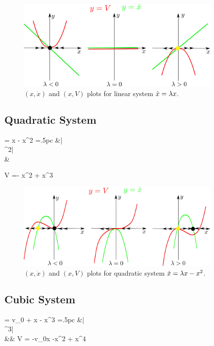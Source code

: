 \begin{figure}[h!]
\centering
\includegraphics[width=4in]
{dynamical-sys/phase-V-linear.png}
\caption{$(x, \dot{x})$ and $(x, V)$ plots for linear
system $\dot{x}=\lambda x$.}
\label{fig-phase-V-linear}
\end{figure}


\subsection{Quadratic System}

\beq
{} = \lam x - x^2
\quad 
\xymatrix@R=.5pc{
&\rvx\ar[dd]|{\;\redplus}
\ar[dl]
\\
\rvx^2\ar[dr]|\redminus
\\
&\dot{\rvx}
}
\eeq

\beq
V =-\; x^2  +  x^3
\eeq 

\begin{figure}[h!]
\centering
\includegraphics[width=4in]
{dynamical-sys/phase-V-quadratic.png}
\caption{$(x, \dot{x})$ and $(x, V)$ plots for quadratic
system $\dot{x}=\lambda x-x^2$.}
\label{fig-phase-V-quadratic}
\end{figure}

\subsection{Cubic System}

\beq
{} = v_0 + \lam x - x^3
\quad 
\xymatrix@R=.5pc{
&\rvx\ar[dd]|{\;\redplus}
\ar[dl]
\\
\rvx^3\ar[dr]|\redminus
\\
&\dot{\rvx}&\ar[l]
}
\eeq
\beq
V = -v_{0}x -\;x^2  +  x^4
\eeq 

